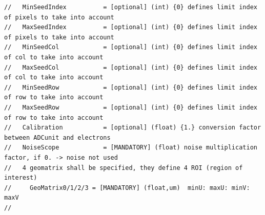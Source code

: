 \documentclass[a4paper, 12pt, twoside]{article}
\begin{document}
\begin{verbatim}
//   MinSeedIndex          = [optional] (int) {0} defines limit index of pixels to take into account
//   MaxSeedIndex          = [optional] (int) {0} defines limit index of pixels to take into account
//   MinSeedCol            = [optional] (int) {0} defines limit index of col to take into account
//   MaxSeedCol            = [optional] (int) {0} defines limit index of col to take into account
//   MinSeedRow            = [optional] (int) {0} defines limit index of row to take into account
//   MaxSeedRow            = [optional] (int) {0} defines limit index of row to take into account
//   Calibration           = [optional] (float) {1.} conversion factor between ADCunit and electrons
//   NoiseScope            = [MANDATORY] (float) noise multiplication factor, if 0. -> noise not used
//   4 geomatrix shall be specified, they define 4 ROI (region of interest)
//     GeoMatrix0/1/2/3 = [MANDATORY] (float,um)  minU: maxU: minV: maxV
//

\end{verbatim}
\end{document}
